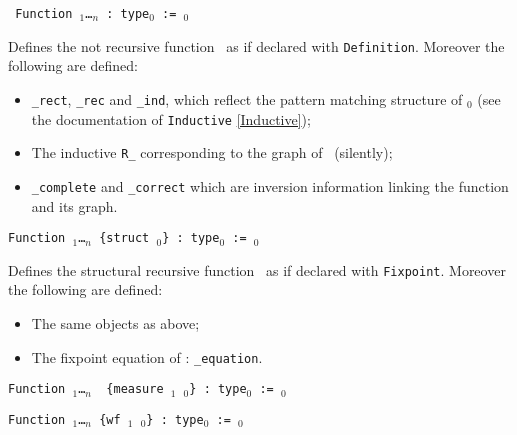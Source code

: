 \begin{Variants}
\item \texttt{ Function {\ident} {\binder$_1$}\ldots{\binder$_n$}
    : type$_0$ := \term$_0$}

  Defines the not recursive function \ident\ as if declared with
  \texttt{Definition}.  Moreover the following are defined:

  \begin{itemize}
  \item {\tt\ident\_rect}, {\tt\ident\_rec} and {\tt\ident\_ind},
    which reflect the pattern matching structure of \term$_0$ (see the
    documentation of {\tt Inductive} \ref{Inductive});
  \item The inductive \texttt{R\_\ident} corresponding to the graph of
    \ident\ (silently);
  \item \texttt{\ident\_complete} and \texttt{\ident\_correct} which are
    inversion information linking the function and its graph.
  \end{itemize}
\item \texttt{Function {\ident} {\binder$_1$}\ldots{\binder$_n$}
    {\tt \{}{\tt struct} \ident$_0${\tt\}} : type$_0$ := \term$_0$}
  
  Defines the structural recursive function \ident\ as if declared
  with \texttt{Fixpoint}.  Moreover the following are defined:

  \begin{itemize}
  \item The same objects as above;
  \item The fixpoint equation of \ident: \texttt{\ident\_equation}.
  \end{itemize}
  
\item \texttt{Function {\ident} {\binder$_1$}\ldots{\binder$_n$} {\tt
      \{}{\tt measure \term$_1$} \ident$_0${\tt\}} : type$_0$ :=
    \term$_0$}
\item \texttt{Function {\ident} {\binder$_1$}\ldots{\binder$_n$}
 {\tt \{}{\tt wf \term$_1$} \ident$_0${\tt\}} : type$_0$ := \term$_0$}


\end{Variants}
